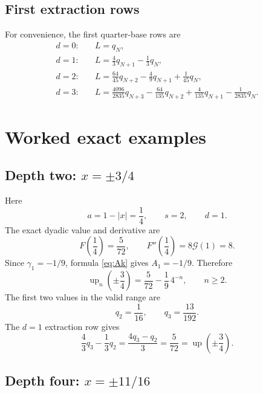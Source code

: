 \documentclass[11pt]{article}
\newcommand{\upf}{\operatorname{up}}
\newcommand{\G}{\mathcal{G}}
\begin{document}
\subsection{First extraction rows}

For convenience, the first quarter-base rows are
\begin{align}
 d=0:\quad &L=q_N,\\
 d=1:\quad &L=\frac43q_{N+1}-\frac13q_N,\\
 d=2:\quad &L=\frac{64}{45}q_{N+2}-\frac49q_{N+1}+\frac1{45}q_N,\\
 d=3:\quad &L=\frac{4096}{2835}q_{N+3}-\frac{64}{135}q_{N+2}
             +\frac4{135}q_{N+1}-\frac1{2835}q_N.
 \label{eq:first-rows}
\end{align}

\section{Worked exact examples}

\subsection{Depth two: \texorpdfstring{$x=\pm3/4$}{x=+/-3/4}}

Here
\begin{equation}
 a=1-|x|=\frac14,
 \qquad s=2,
 \qquad d=1.
\end{equation}
The exact dyadic value and derivative are
\begin{equation}
 F\!\left(\frac14\right)=\frac5{72},
 \qquad
 F''\!\left(\frac14\right)=8\G(1)=8.
\end{equation}
Since $\gamma_1=-1/9$, formula \eqref{eq:Ak} gives $A_1=-1/9$.  Therefore
\begin{equation}
 \boxed{
 \upf_n\!\left(\pm\frac34\right)
 =\frac5{72}-\frac19\,4^{-n},
 \qquad n\ge2.}
 \label{eq:quarter-example-tail}
\end{equation}
The first two values in the valid range are
\begin{equation}
 q_2=\frac1{16},
 \qquad
 q_3=\frac{13}{192}.
\end{equation}
The $d=1$ extraction row gives
\begin{equation}
 \frac43q_3-\frac13q_2
 =\frac{4q_3-q_2}{3}
 =\frac5{72}=\upf\!\left(\pm\frac34\right).
\end{equation}

\subsection{Depth four: \texorpdfstring{$x=\pm11/16$}{x=+/-11/16}}
\end{document}

